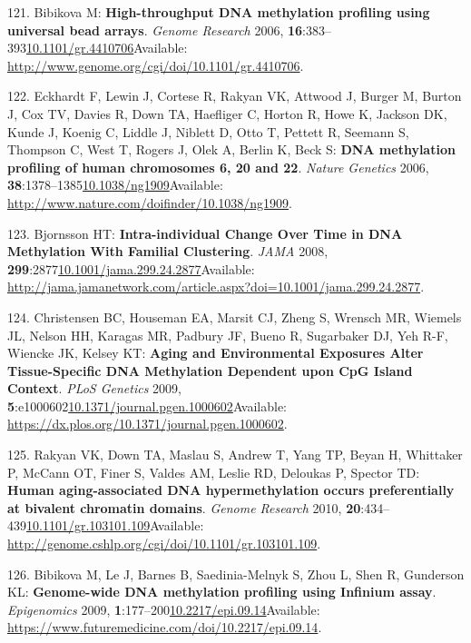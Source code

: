 \documentclass[
]{book}
\begin{document}
\leavevmode\hypertarget{ref-Bibikova2006}{}%
121. Bibikova M: \textbf{High-throughput DNA methylation profiling using universal bead arrays}. \emph{Genome Research} 2006, \textbf{16}:383--393\href{https://doi.org/10.1101/gr.4410706}{10.1101/gr.4410706}Available: \url{http://www.genome.org/cgi/doi/10.1101/gr.4410706}.

\leavevmode\hypertarget{ref-Eckhardt2006}{}%
122. Eckhardt F, Lewin J, Cortese R, Rakyan VK, Attwood J, Burger M, Burton J, Cox TV, Davies R, Down TA, Haefliger C, Horton R, Howe K, Jackson DK, Kunde J, Koenig C, Liddle J, Niblett D, Otto T, Pettett R, Seemann S, Thompson C, West T, Rogers J, Olek A, Berlin K, Beck S: \textbf{DNA methylation profiling of human chromosomes 6, 20 and 22}. \emph{Nature Genetics} 2006, \textbf{38}:1378--1385\href{https://doi.org/10.1038/ng1909}{10.1038/ng1909}Available: \url{http://www.nature.com/doifinder/10.1038/ng1909}.

\leavevmode\hypertarget{ref-Bjornsson2008}{}%
123. Bjornsson HT: \textbf{Intra-individual Change Over Time in DNA Methylation With Familial Clustering}. \emph{JAMA} 2008, \textbf{299}:2877\href{https://doi.org/10.1001/jama.299.24.2877}{10.1001/jama.299.24.2877}Available: \url{http://jama.jamanetwork.com/article.aspx?doi=10.1001/jama.299.24.2877}.

\leavevmode\hypertarget{ref-Christensen2009}{}%
124. Christensen BC, Houseman EA, Marsit CJ, Zheng S, Wrensch MR, Wiemels JL, Nelson HH, Karagas MR, Padbury JF, Bueno R, Sugarbaker DJ, Yeh R-F, Wiencke JK, Kelsey KT: \textbf{Aging and Environmental Exposures Alter Tissue-Specific DNA Methylation Dependent upon CpG Island Context}. \emph{PLoS Genetics} 2009, \textbf{5}:e1000602\href{https://doi.org/10.1371/journal.pgen.1000602}{10.1371/journal.pgen.1000602}Available: \url{https://dx.plos.org/10.1371/journal.pgen.1000602}.

\leavevmode\hypertarget{ref-Rakyan2010}{}%
125. Rakyan VK, Down TA, Maslau S, Andrew T, Yang TP, Beyan H, Whittaker P, McCann OT, Finer S, Valdes AM, Leslie RD, Deloukas P, Spector TD: \textbf{Human aging-associated DNA hypermethylation occurs preferentially at bivalent chromatin domains}. \emph{Genome Research} 2010, \textbf{20}:434--439\href{https://doi.org/10.1101/gr.103101.109}{10.1101/gr.103101.109}Available: \url{http://genome.cshlp.org/cgi/doi/10.1101/gr.103101.109}.

\leavevmode\hypertarget{ref-Bibikova2009}{}%
126. Bibikova M, Le J, Barnes B, Saedinia-Melnyk S, Zhou L, Shen R, Gunderson KL: \textbf{Genome-wide DNA methylation profiling using Infinium assay}. \emph{Epigenomics} 2009, \textbf{1}:177--200\href{https://doi.org/10.2217/epi.09.14}{10.2217/epi.09.14}Available: \url{https://www.futuremedicine.com/doi/10.2217/epi.09.14}.
\end{document}

